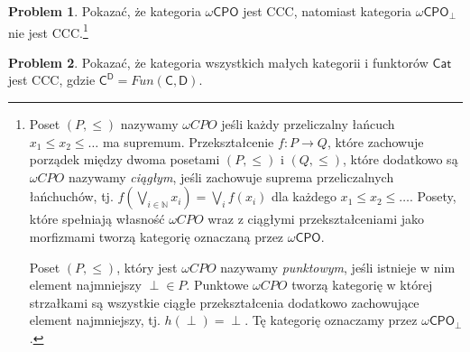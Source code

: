\documentclass[10pt]{amsart}
\theoremstyle{plain}
\theoremstyle{definition}
\newtheorem{problem}{Problem}
\numberwithin{equation}{section}
\begin{document}
\begin{problem}
Pokazać, że kategoria $\omega \mathsf{CPO}$ jest CCC, natomiast kategoria $\omega \mathsf{CPO}_\perp$ nie jest CCC.\footnote{Poset $(P,\leq)$ nazywamy $\omega CPO$ jeśli każdy przeliczalny łańcuch $x_1\leq x_2 \leq \dots$ ma supremum. Przekształcenie $f:P\to Q$, które zachowuje porządek między dwoma posetami $(P,\leq)$ i $(Q,\leq)$, które dodatkowo są $\omega CPO$ nazywamy \emph{ciągłym}, jeśli zachowuje suprema przeliczalnych łańchuchów, tj. $f(\bigvee_{i\in \mathbb{N}} x_i ) = \bigvee_{i} f(x_i)$ dla każdego $x_1\leq x_2\leq \ldots$. Posety, które spełniają własność $\omega CPO$ wraz z ciągłymi przekształceniami jako morfizmami tworzą kategorię oznaczaną przez $\omega\mathsf{CPO}$. 

Poset $(P,\leq)$, który jest $\omega CPO$ nazywamy \emph{punktowym}, jeśli istnieje w nim element najmniejszy $\perp\in P$. Punktowe $\omega CPO$ tworzą kategorię w której strzałkami są wszystkie ciągłe przekształcenia dodatkowo zachowujące element najmniejszy, tj. $h(\perp)= \perp$. Tę kategorię oznaczamy przez $\omega \mathsf{CPO}_\perp$.}  
\end{problem}


\begin{problem}
Pokazać, że kategoria wszystkich małych kategorii i funktorów $\mathsf{Cat}$ jest CCC, gdzie $\mathsf{C}^\mathsf{D} = Fun(\mathsf{C},\mathsf{D})$. 
\end{problem}
%
%
%
\end{document}
